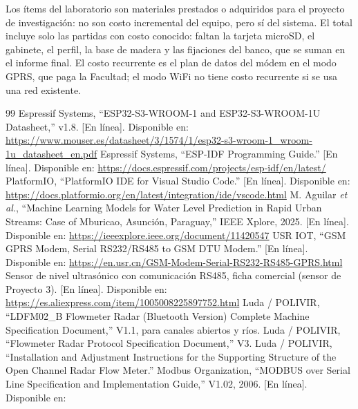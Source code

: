 \documentclass[11pt,a4paper]{article}
\begin{document}
Los ítems del laboratorio son materiales prestados o adquiridos para el
proyecto de investigación: no son costo incremental del equipo, pero sí del
sistema. El total incluye solo las partidas con costo conocido: faltan la
tarjeta microSD, el gabinete, el perfil, la base de madera y las fijaciones del
banco, que se suman en el informe final. El costo recurrente es el plan de datos del módem en el modo
GPRS, que paga la Facultad; el modo WiFi no tiene costo recurrente si se usa
una red existente.

\clearpage


\begin{thebibliography}{99}
\small
{} Espressif Systems, ``ESP32-S3-WROOM-1 and ESP32-S3-WROOM-1U
    Datasheet,'' v1.8. [En línea]. Disponible en:
    \url{https://www.mouser.es/datasheet/3/1574/1/esp32-s3-wroom-1_wroom-1u_datasheet_en.pdf}
 Espressif Systems, ``ESP-IDF Programming Guide.'' [En línea].
    Disponible en: \url{https://docs.espressif.com/projects/esp-idf/en/latest/}
 PlatformIO, ``PlatformIO IDE for Visual Studio Code.'' [En
    línea]. Disponible en:
    \url{https://docs.platformio.org/en/latest/integration/ide/vscode.html}
 M. Aguilar \emph{et al.}, ``Machine Learning Models for
    Water Level Prediction in Rapid Urban Streams: Case of Mburicao, Asunción,
    Paraguay,'' IEEE Xplore, 2025. [En línea]. Disponible en:
    \url{https://ieeexplore.ieee.org/document/11420547}
 USR IOT, ``GSM GPRS Modem, Serial RS232/RS485 to GSM DTU
    Modem.'' [En línea]. Disponible en:
    \url{https://en.usr.cn/GSM-Modem-Serial-RS232-RS485-GPRS.html}
 Sensor de nivel ultrasónico con comunicación RS485,
    ficha comercial (sensor de Proyecto 3). [En línea]. Disponible en:
    \url{https://es.aliexpress.com/item/1005008225897752.html}
 Luda / POLIVIR, ``LDFM02\_B Flowmeter Radar (Bluetooth
    Version) Complete Machine Specification Document,'' V1.1, para canales
    abiertos y ríos.
 Luda / POLIVIR, ``Flowmeter Radar Protocol
    Specification Document,'' V3.
 Luda / POLIVIR, ``Installation and Adjustment
    Instructions for the Supporting Structure of the Open Channel Radar Flow
    Meter.''
 Modbus Organization, ``MODBUS over Serial Line Specification
    and Implementation Guide,'' V1.02, 2006. [En línea]. Disponible en:

\end{thebibliography}
\end{document}
